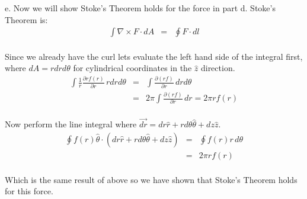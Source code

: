 \documentclass[11pt]{amsart}
\begin{document}
e. Now we will show Stoke's Theorem holds for the force in part d. Stoke's Theorem is: \\
\begin{eqnarray*} 
\int{\nabla \times F\cdot{dA}} &=& \oint{F\cdot{dl}} 
\end{eqnarray*} \\
Since we already have the curl lets evaluate the left hand side of the integral first, where $dA=rdrd\theta$ for cylindrical coordinates in the $\hat{z}$ direction. \\
\begin{eqnarray*} 
\int{\frac{1}{r}\frac{\partial{rf(r)}}{\partial{r}}\,rdrd\theta} &=& \int{\frac{\partial{(rf)}}{\partial{r}}\,drd\theta} \\
&=& 2\pi\int{\frac{\partial{(rf)}}{\partial{r}}\,dr} = 2\pi{rf(r)} 
\end{eqnarray*} \\
Now perform the line integral where $\vec{dr}=dr\hat{r}+rd\theta\hat{\theta}+dz\hat{z}$. \\
\begin{eqnarray*} 
\oint{f(r)\hat{\theta}\cdot{(dr\hat{r}+rd\theta\hat{\theta}+dz\hat{z})}} &=& \oint{f(r)r\,d\theta} \\
&=& 2\pi{rf(r)} 
\end{eqnarray*} \\
Which is the same result of above so we have shown that Stoke's Theorem holds for this force. \\
\end{document}
